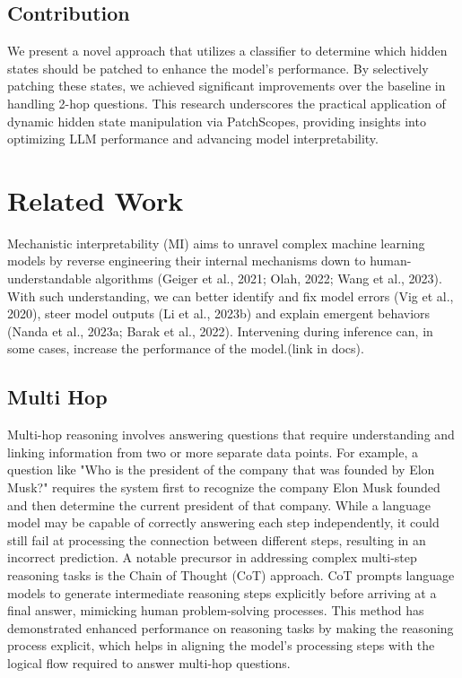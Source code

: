 \documentclass[11pt]{article}
\begin{document}
\subsection*{Contribution}
We present a novel approach that utilizes a classifier to determine which hidden states should be patched to enhance the model’s performance. By selectively patching these states, we achieved significant improvements over the baseline in handling 2-hop questions. This research underscores the practical application of dynamic hidden state manipulation via PatchScopes, providing insights into optimizing LLM performance and advancing model interpretability.
\section{Related Work}
Mechanistic interpretability (MI) aims to unravel complex machine learning models by reverse engineering their internal mechanisms down to human-understandable algorithms (Geiger et al., 2021; Olah, 2022; Wang et al., 2023). With such understanding, we can better identify and fix model errors (Vig et al., 2020), steer model outputs (Li et al., 2023b) and explain emergent behaviors (Nanda et al., 2023a; Barak et al., 2022). 
Intervening during inference can, in some cases, increase the performance of the model.(link in docs).


\subsection*{Multi Hop}
Multi-hop reasoning involves answering questions that require understanding and linking information from two or more separate data points. For example, a question like "Who is the president of the company that was founded by Elon Musk?" requires the system first to recognize the company Elon Musk founded and then determine the current president of that company. While a language model may be capable of correctly answering each step independently, it could still fail at processing the connection between different steps, resulting in an incorrect prediction.
A notable precursor in addressing complex multi-step reasoning tasks is the Chain of Thought (CoT) approach. CoT prompts language models to generate intermediate reasoning steps explicitly before arriving at a final answer, mimicking human problem-solving processes. This method has demonstrated enhanced performance on reasoning tasks by making the reasoning process explicit, which helps in aligning the model's processing steps with the logical flow required to answer multi-hop questions.
\end{document}
